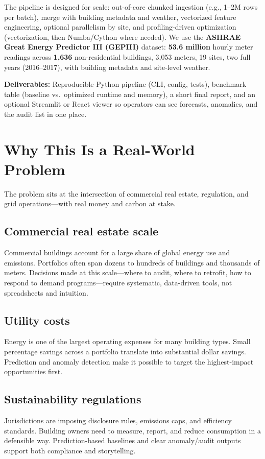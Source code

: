 \documentclass[11pt,a4paper]{article}
\begin{document}
The pipeline is designed for scale: out-of-core chunked ingestion (e.g., 1--2M rows per batch), merge with building metadata and weather, vectorized feature engineering, optional parallelism by site, and profiling-driven optimization (vectorization, then Numba/Cython where needed). We use the \textbf{ASHRAE Great Energy Predictor III (GEPIII)} dataset: \textbf{53.6 million} hourly meter readings across \textbf{1,636} non-residential buildings, 3,053 meters, 19 sites, two full years (2016--2017), with building metadata and site-level weather.

\noindent\textbf{Deliverables:} Reproducible Python pipeline (CLI, config, tests), benchmark table (baseline vs.\ optimized runtime and memory), a short final report, and an optional Streamlit or React viewer so operators can see forecasts, anomalies, and the audit list in one place.

\section{Why This Is a Real-World Problem}

The problem sits at the intersection of commercial real estate, regulation, and grid operations---with real money and carbon at stake.

\subsection{Commercial real estate scale}
Commercial buildings account for a large share of global energy use and emissions. Portfolios often span dozens to hundreds of buildings and thousands of meters. Decisions made at this scale---where to audit, where to retrofit, how to respond to demand programs---require systematic, data-driven tools, not spreadsheets and intuition.

\subsection{Utility costs}
Energy is one of the largest operating expenses for many building types. Small percentage savings across a portfolio translate into substantial dollar savings. Prediction and anomaly detection make it possible to target the highest-impact opportunities first.

\subsection{Sustainability regulations}
Jurisdictions are imposing disclosure rules, emissions caps, and efficiency standards. Building owners need to measure, report, and reduce consumption in a defensible way. Prediction-based baselines and clear anomaly/audit outputs support both compliance and storytelling.
\end{document}
